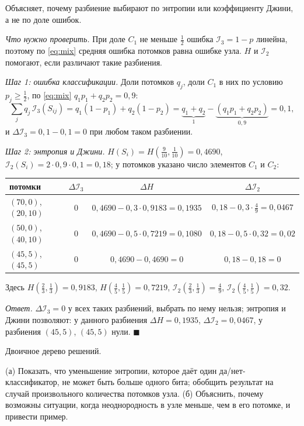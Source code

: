 \documentclass[12pt,a4paper]{article}
\begin{document}
\zachem Объясняет, почему разбиение выбирают по энтропии или коэффициенту Джини,
а не по доле ошибок.

\resh \emph{Что нужно проверить.} При доле $C_1$ не меньше $\frac12$ ошибка
$\mathcal{I}_3 = 1 - p$ линейна, поэтому по \eqref{eq:mix} средняя ошибка потомков
равна ошибке узла. $H$ и $\mathcal{I}_2$ помогают, если различают такие разбиения.

\emph{Шаг 1: ошибка классификации.} Доли потомков $q_j$, доли $C_1$ в них по
условию $p_j \ge \frac12$, по \eqref{eq:mix} $q_1p_1 + q_2p_2 = 0{,}9$:
\[
  \sum_j q_j\,\mathcal{I}_3(S_{ij}) = q_1(1 - p_1) + q_2(1 - p_2)
  = \underbrace{q_1 + q_2}_{1} - \underbrace{(q_1p_1 + q_2p_2)}_{0{,}9} = 0{,}1,
\]
и $\Delta\mathcal{I}_3 = 0{,}1 - 0{,}1 = 0$ при любом таком разбиении.

\emph{Шаг 2: энтропия и Джини.} $H(S_i) = H(\frac{9}{10}, \frac{1}{10}) = 0{,}4690$,
$\mathcal{I}_2(S_i) = 2 \cdot 0{,}9 \cdot 0{,}1 = 0{,}18$; у потомков указано число
элементов $C_1$ и $C_2$:
\begin{center}
\begin{tabular}{lccc}
\toprule
потомки & $\Delta\mathcal{I}_3$ & $\Delta H$ & $\Delta\mathcal{I}_2$ \\
\midrule
$(70, 0)$, $(20, 10)$ & $0$ & $0{,}4690 - 0{,}3 \cdot 0{,}9183 = 0{,}1935$
  & $0{,}18 - 0{,}3 \cdot \frac49 = 0{,}0467$ \\[1mm]
$(50, 0)$, $(40, 10)$ & $0$ & $0{,}4690 - 0{,}5 \cdot 0{,}7219 = 0{,}1080$
  & $0{,}18 - 0{,}5 \cdot 0{,}32 = 0{,}02$ \\[1mm]
$(45, 5)$, $(45, 5)$ & $0$ & $0{,}4690 - 0{,}4690 = 0$ & $0{,}18 - 0{,}18 = 0$ \\
\bottomrule
\end{tabular}
\end{center}
Здесь $H(\frac23, \frac13) = 0{,}9183$, $H(\frac45, \frac15) = 0{,}7219$,
$\mathcal{I}_2(\frac23, \frac13) = \frac49$, $\mathcal{I}_2(\frac45, \frac15) = 0{,}32$.

\emph{Ответ.} $\Delta\mathcal{I}_3 = 0$ у всех таких разбиений, выбрать по нему
нельзя; энтропия и Джини позволяют: у данного разбиения $\Delta H = 0{,}1935$,
$\Delta\mathcal{I}_2 = 0{,}0467$, у разбиения $(45, 5)$, $(45, 5)$ нули.
$\blacksquare$

\dano Двоичное дерево решений.

\treb (а) Показать, что уменьшение энтропии, которое даёт один
да/нет-классификатор, не может быть больше одного бита; обобщить результат на
случай произвольного количества потомков узла. (б) Объяснить, почему возможны
ситуации, когда неоднородность в узле меньше, чем в его потомке, и привести
пример.
\end{document}
